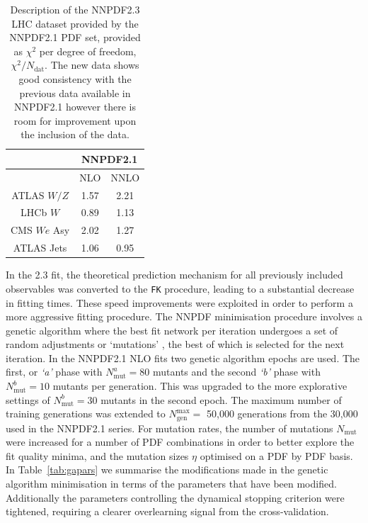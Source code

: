 \begin{table}[htp]
\begin{center}
\begin{tabular}{c|c|c}

\hline
  & \multicolumn{2}{c}{NNPDF2.1}\\ \hline
    & NLO& NNLO\\
 \hline \hline 
 ATLAS $W/Z$ & 1.57 & 2.21 \\
 \hline
 LHCb $W$ &0.89 &1.13 \\
 \hline
 CMS $We$ Asy & 2.02 & 1.27 \\
 \hline\hline
 ATLAS Jets & 1.06& 0.95\\
 \hline
\end{tabular}
\caption[Description of the NNPDF2.3 LHC dataset by the NNPDF2.1 PDF set]{Description of the NNPDF2.3 LHC dataset provided by the NNPDF2.1 PDF set, provided as $\chi^2$ per degree of freedom, $\chi^2/N_{\text{dat}}$. The new data shows good consistency with the previous data available in NNPDF2.1 however there is room for improvement upon the inclusion of the data.}
\label{tab:23datagreement}
\end{center}
\end{table}

In the 2.3 fit, the theoretical prediction mechanism for all previously included observables was converted to the {\tt FK} procedure, leading to a substantial decrease in fitting times. These speed improvements were exploited in order to perform a more aggressive fitting procedure. The NNPDF minimisation procedure involves a genetic algorithm where the best fit network per iteration undergoes a set of random adjustments or `mutations' , the best of which is selected for the next iteration. In the NNPDF2.1 NLO fits two genetic algorithm epochs are used. The first, or \emph{`a'} phase with $N_{\text{mut}}^a=80$ mutants and the second \emph{`b'} phase with $N_{\text{mut}}^b=10$ mutants per generation. This was upgraded to the more explorative settings of $N_{\text{mut}}^b=30$ mutants in the second epoch. The maximum number of training generations was extended to $N_{\text{gen}}^{\text{max}}=$ 50,000 generations from the 30,000 used in the NNPDF2.1 series.  For mutation rates, the number of mutations $N_{\text{mut}}$ were increased for a number of PDF combinations in order to better explore the fit quality minima, and the mutation sizes $\eta$ optimised on a PDF by PDF basis. In Table~\ref{tab:gapars} we summarise the modifications made in the genetic algorithm minimisation in terms of the parameters that have been modified. Additionally the parameters controlling the dynamical stopping criterion were tightened, requiring a clearer overlearning signal from the cross-validation.

